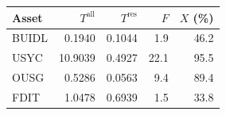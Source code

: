 \begin{tabular}{@{}lrrrr@{}}
\toprule
Asset & $T^{\mathrm{all}}$ & $T^{\mathrm{res}}$ & $F$ & $X$ (\%) \\
\midrule
BUIDL & 0.1940 & 0.1044 & 1.9 & 46.2 \\
USYC & 10.9039 & 0.4927 & 22.1 & 95.5 \\
OUSG & 0.5286 & 0.0563 & 9.4 & 89.4 \\
FDIT & 1.0478 & 0.6939 & 1.5 & 33.8 \\
\bottomrule
\end{tabular}
